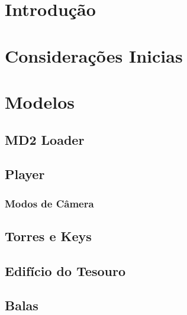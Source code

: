 \documentclass[12pt,a4paper,portuges]{style/myreport}
\begin{document}
\newpage




\chapter{Introdução}


\newpage

\chapter{Considerações Inicias}


\newpage


\chapter{Modelos}


\newpage

\section{MD2 Loader}


\newpage

\section{Player}

\subsection{Modos de Câmera}


\newpage

\section{Torres e Keys}


\section{Edifício do Tesouro}


\section{Balas}

\newpage
\end{document}
